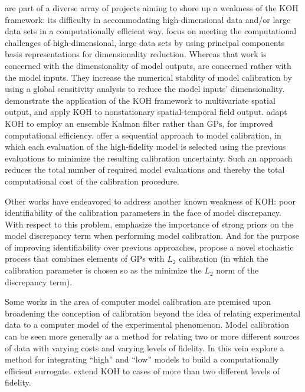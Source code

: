 \documentclass[10pt,a4paper]{article}
\begin{document}
\citet{Paulo2012} are part of a diverse array of projects aiming to shore up a weakness of the KOH framework: its difficulty in accommodating high-dimensional data and/or large data sets in a computationally efficient way.
\citet{Higdon2008a} focus on meeting the computational challenges of high-dimensional, large data sets by using principal components basis representations for dimensionality reduction.
Whereas that work is concerned with the dimensionality of model outputs, \citet{Drignei2012} are concerned rather with the model inputs.
They increase the numerical stability of model calibration by using a global sensitivity analysis to reduce the model inputs' dimensionality.
\citet{Bhat2010} demonstrate the application of the KOH framework to multivariate spatial output, and \citet{Pratola2013} apply KOH to nonstationary spatial-temporal field output.
\citet{Higdon2013} adapt KOH to employ an ensemble Kalman filter rather than GPs, for improved computational efficiency.
\citet{Yuan2013} offer a sequential approach to model calibration, in which each evaluation of the high-fidelity model is selected using the previous evaluations to minimize the resulting calibration uncertainty. 
Such an approach reduces the total number of required model evaluations and thereby the total computational cost of the calibration procedure.

Other works have endeavored to address another known weakness of KOH: poor identifiability of the calibration parameters in the face of model discrepancy.
With respect to this problem, \citet{Brynjarsdottir2014} emphasize the importance of strong priors on the model discrepancy term when performing model calibration.
And for the purpose of improving identifiability over previous approaches, \citet{Gu2018} propose a novel stochastic process that combines elements of GPs with $L_2$ calibration (in which the calibration parameter is chosen so as the minimize the $L_2$ norm of the discrepancy term).

Some works in the area of computer model calibration are premised upon broadening the conception of calibration beyond the idea of relating experimental data to a computer model of the experimental phenomenon.
Model calibration can be seen more generally as a method for relating two or more different sources of data with varying costs and varying levels of fidelity.
In this vein \citet{Qian2006} explore a method for integrating ``high'' and ``low'' models to build a computationally efficient surrogate.
\citet{Goh2013} extend KOH to cases of more than two different levels of fidelity.
\end{document}
